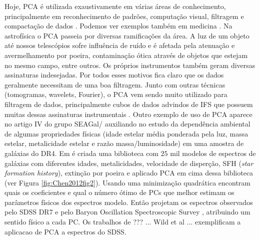 Hoje, PCA é utilizada exaustivamente em várias áreas de conhecimento, principalmente em reconhecimento de padrões,
computação visual, filtragem e compactação de dados \citep{Kamruzzaman2010, Borcea2012}. Podemos ver exemplos também em
medicina \citep{Balakrishnan2013}. Na astrofísica o PCA passeia por diversas ramificações da área. A luz de um objeto
até nossos telescópios sofre influência de ruído e é afetada pela atenuação e avermelhamento por poeira, contaminação
ótica através de objetos que estejam no mesmo campo, entre outros. Os próprios instrumentos também geram diversas
assinaturas indesejadas. Por todos esses motivos fica claro que os dados geralmente necessitam de uma boa filtragem.
Junto com outras técnicas (tomogramas, wavelets, Fourier), o PCA vem sendo muito utilizado para filtragem de dados,
principalmente cubos de dados advindos de IFS que possuem muitas dessas assinaturas instrumentais \citep{Riffel2011}.
Outro exemplo de uso de PCA aparece no artigo IV do grupo SEAGal/\starlight \citep{Mateus2007} auxiliando no estudo da
dependência ambiental de algumas propriedades físicas (idade estelar média ponderada pela luz, massa estelar,
metalicidade estelar e razão massa/luminosidade) em uma amostra de galáxias do \SDSS DR4. Em \citet{Chen2012} é criada
uma biblioteca com $25$ mil modelos de espectros de galáxias com diferentes idades, metalicidades, velocidade de
disperção, SFH ({\em star formation history}), extinção por poeira e aplicado PCA em cima dessa biblioteca (ver Figura
\ref{fig:Chen2012fig2}). Usando uma minimização quadrática encontram quais os coeficientes e qual o número ótimo de PCs
que melhor estimam os parâmetros físicos dos espectros modelo. Então projetam os espectros observados pelo SDSS DR7
\citep{Abazajian2009} e pelo Baryon Oscillation Spectroscopic Survey \citep[BOSS][]{Ahn2012}, atribuindo um sentido
físico a cada PC. Os trabalhos de \ojo ??? ... Wild et al  ... exemplificam a aplicacao de PCA a espectros do SDSS.

